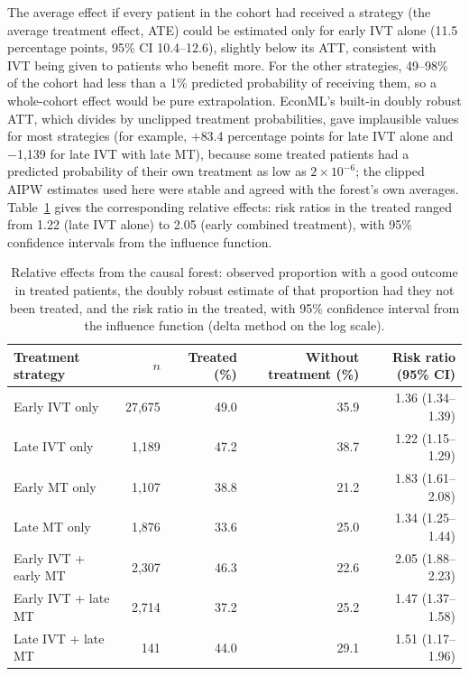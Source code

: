 The average effect if every patient in the cohort had received a strategy (the average treatment effect, ATE) could be estimated only for early IVT alone (11.5 percentage points, 95\% CI 10.4--12.6), slightly below its ATT, consistent with IVT being given to patients who benefit more. For the other strategies, 49--98\% of the cohort had less than a 1\% predicted probability of receiving them, so a whole-cohort effect would be pure extrapolation. EconML's built-in doubly robust ATT, which divides by unclipped treatment probabilities, gave implausible values for most strategies (for example, $+$83.4 percentage points for late IVT alone and $-$1,139 for late IVT with late MT), because some treated patients had a predicted probability of their own treatment as low as $2 \times 10^{-6}$; the clipped AIPW estimates used here were stable and agreed with the forest's own averages. Table~\ref{tab:cf_relative} gives the corresponding relative effects: risk ratios in the treated ranged from 1.22 (late IVT alone) to 2.05 (early combined treatment), with 95\% confidence intervals from the influence function.

\begin{table}[htbp]
\centering
\footnotesize
\caption{Relative effects from the causal forest: observed proportion with a good outcome in treated patients, the doubly robust estimate of that proportion had they not been treated, and the risk ratio in the treated, with 95\% confidence interval from the influence function (delta method on the log scale).}
\label{tab:cf_relative}
\begin{tabular}{@{}lrrrr@{}}
\toprule
Treatment strategy & $n$ & Treated (\%) & Without treatment (\%) & Risk ratio (95\% CI) \\
\midrule
Early IVT only & 27,675 & 49.0 & 35.9 & 1.36 (1.34--1.39) \\
Late IVT only & 1,189 & 47.2 & 38.7 & 1.22 (1.15--1.29) \\
Early MT only & 1,107 & 38.8 & 21.2 & 1.83 (1.61--2.08) \\
Late MT only & 1,876 & 33.6 & 25.0 & 1.34 (1.25--1.44) \\
Early IVT + early MT & 2,307 & 46.3 & 22.6 & 2.05 (1.88--2.23) \\
Early IVT + late MT & 2,714 & 37.2 & 25.2 & 1.47 (1.37--1.58) \\
Late IVT + late MT & 141 & 44.0 & 29.1 & 1.51 (1.17--1.96) \\
\bottomrule
\end{tabular}
\end{table}

